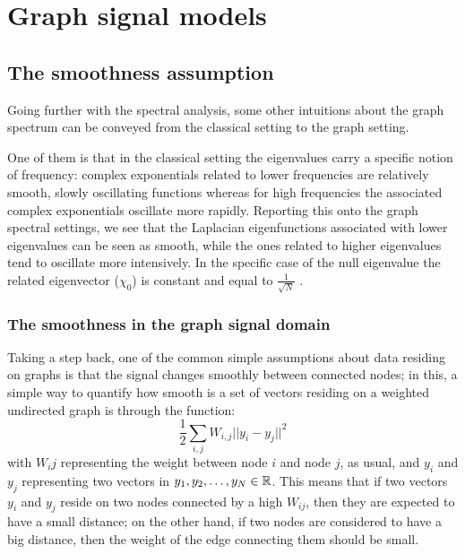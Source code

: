\chapter{Graph signal models}
\section{The smoothness assumption}
\label{ch:smoothness}
Going further with the spectral analysis, some other intuitions about the graph spectrum can be conveyed from the classical setting to the graph setting.

One of them is that in the classical setting the eigenvalues carry a specific notion of frequency: complex exponentials related to lower frequencies are relatively smooth, slowly oscillating functions whereas for high frequencies the associated complex exponentials oscillate more rapidly. Reporting this onto the graph spectral settings, we see that the Laplacian eigenfunctions associated with lower eigenvalues can be seen as smooth, while the ones related to higher eigenvalues tend to oscillate more intensively. \cite{Shuman2016} In the specific case of the null eigenvalue  the related eigenvector ($\chi_0$) is constant and equal to $\frac{1}{\sqrt{N}}$ \cite{Shuman2013}.
\subsection{The smoothness in the graph signal domain}
Taking a step back, one of the common simple assumptions about data residing on graphs is that the signal changes smoothly between connected nodes; in this, a simple way to quantify how smooth is a set of vectors residing on a weighted undirected graph is through the function:
\begin{equation}
\frac{1}{2} \sum_{i,j}W_{i,j}||y_i - y_j||^2
\label{eq:smooth}
\end{equation}
with $W_ij$ representing the weight between node $i$ and node $j$, as usual, and $y_i$ and $y_j$ representing two vectors in $y_1, y_2, \dots, y_N \in \mathbb{R}$. This means that if two vectors $y_i$ and $y_j$ reside on two nodes connected by a high $W_{ij}$, then they are expected to have a small distance; on the other hand, if two nodes are considered to have a big distance, then the weight of the edge connecting them should be small.

